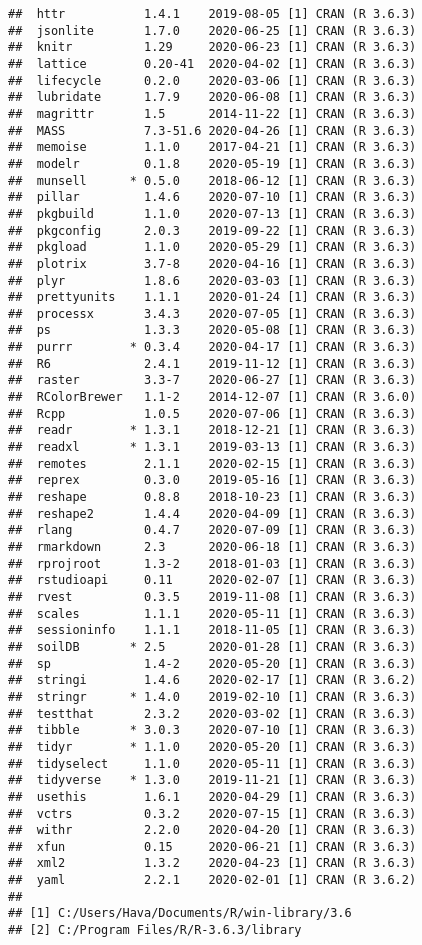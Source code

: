 \documentclass[
]{book}
\begin{document}
\begin{verbatim}
##  httr           1.4.1    2019-08-05 [1] CRAN (R 3.6.3)
##  jsonlite       1.7.0    2020-06-25 [1] CRAN (R 3.6.3)
##  knitr          1.29     2020-06-23 [1] CRAN (R 3.6.3)
##  lattice        0.20-41  2020-04-02 [1] CRAN (R 3.6.3)
##  lifecycle      0.2.0    2020-03-06 [1] CRAN (R 3.6.3)
##  lubridate      1.7.9    2020-06-08 [1] CRAN (R 3.6.3)
##  magrittr       1.5      2014-11-22 [1] CRAN (R 3.6.3)
##  MASS           7.3-51.6 2020-04-26 [1] CRAN (R 3.6.3)
##  memoise        1.1.0    2017-04-21 [1] CRAN (R 3.6.3)
##  modelr         0.1.8    2020-05-19 [1] CRAN (R 3.6.3)
##  munsell      * 0.5.0    2018-06-12 [1] CRAN (R 3.6.3)
##  pillar         1.4.6    2020-07-10 [1] CRAN (R 3.6.3)
##  pkgbuild       1.1.0    2020-07-13 [1] CRAN (R 3.6.3)
##  pkgconfig      2.0.3    2019-09-22 [1] CRAN (R 3.6.3)
##  pkgload        1.1.0    2020-05-29 [1] CRAN (R 3.6.3)
##  plotrix        3.7-8    2020-04-16 [1] CRAN (R 3.6.3)
##  plyr           1.8.6    2020-03-03 [1] CRAN (R 3.6.3)
##  prettyunits    1.1.1    2020-01-24 [1] CRAN (R 3.6.3)
##  processx       3.4.3    2020-07-05 [1] CRAN (R 3.6.3)
##  ps             1.3.3    2020-05-08 [1] CRAN (R 3.6.3)
##  purrr        * 0.3.4    2020-04-17 [1] CRAN (R 3.6.3)
##  R6             2.4.1    2019-11-12 [1] CRAN (R 3.6.3)
##  raster         3.3-7    2020-06-27 [1] CRAN (R 3.6.3)
##  RColorBrewer   1.1-2    2014-12-07 [1] CRAN (R 3.6.0)
##  Rcpp           1.0.5    2020-07-06 [1] CRAN (R 3.6.3)
##  readr        * 1.3.1    2018-12-21 [1] CRAN (R 3.6.3)
##  readxl       * 1.3.1    2019-03-13 [1] CRAN (R 3.6.3)
##  remotes        2.1.1    2020-02-15 [1] CRAN (R 3.6.3)
##  reprex         0.3.0    2019-05-16 [1] CRAN (R 3.6.3)
##  reshape        0.8.8    2018-10-23 [1] CRAN (R 3.6.3)
##  reshape2       1.4.4    2020-04-09 [1] CRAN (R 3.6.3)
##  rlang          0.4.7    2020-07-09 [1] CRAN (R 3.6.3)
##  rmarkdown      2.3      2020-06-18 [1] CRAN (R 3.6.3)
##  rprojroot      1.3-2    2018-01-03 [1] CRAN (R 3.6.3)
##  rstudioapi     0.11     2020-02-07 [1] CRAN (R 3.6.3)
##  rvest          0.3.5    2019-11-08 [1] CRAN (R 3.6.3)
##  scales         1.1.1    2020-05-11 [1] CRAN (R 3.6.3)
##  sessioninfo    1.1.1    2018-11-05 [1] CRAN (R 3.6.3)
##  soilDB       * 2.5      2020-01-28 [1] CRAN (R 3.6.3)
##  sp             1.4-2    2020-05-20 [1] CRAN (R 3.6.3)
##  stringi        1.4.6    2020-02-17 [1] CRAN (R 3.6.2)
##  stringr      * 1.4.0    2019-02-10 [1] CRAN (R 3.6.3)
##  testthat       2.3.2    2020-03-02 [1] CRAN (R 3.6.3)
##  tibble       * 3.0.3    2020-07-10 [1] CRAN (R 3.6.3)
##  tidyr        * 1.1.0    2020-05-20 [1] CRAN (R 3.6.3)
##  tidyselect     1.1.0    2020-05-11 [1] CRAN (R 3.6.3)
##  tidyverse    * 1.3.0    2019-11-21 [1] CRAN (R 3.6.3)
##  usethis        1.6.1    2020-04-29 [1] CRAN (R 3.6.3)
##  vctrs          0.3.2    2020-07-15 [1] CRAN (R 3.6.3)
##  withr          2.2.0    2020-04-20 [1] CRAN (R 3.6.3)
##  xfun           0.15     2020-06-21 [1] CRAN (R 3.6.3)
##  xml2           1.3.2    2020-04-23 [1] CRAN (R 3.6.3)
##  yaml           2.2.1    2020-02-01 [1] CRAN (R 3.6.2)
## 
## [1] C:/Users/Hava/Documents/R/win-library/3.6
## [2] C:/Program Files/R/R-3.6.3/library
\end{verbatim}

  
\end{document}

